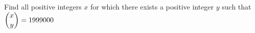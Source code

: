Find all positive integers $x$ for which there exists a positive integer $y$ such that $\dbinom{x}{y}=1999000$